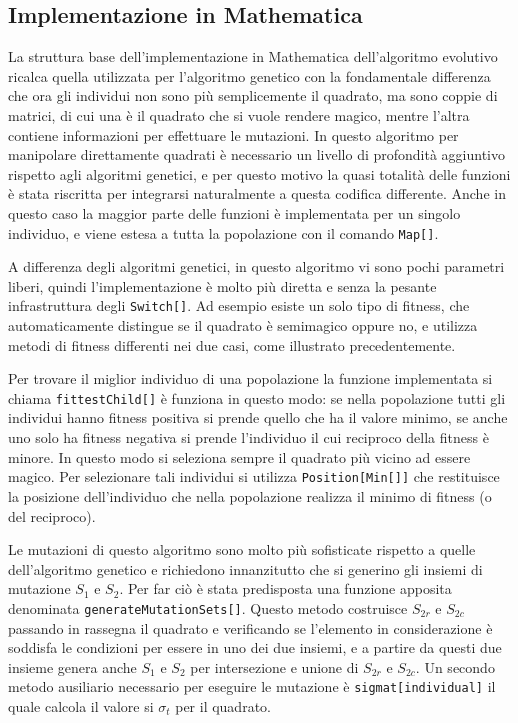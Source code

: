 \documentclass[italian,twoside,twocolumn]{article}
\begin{document}
\subsection{Implementazione in Mathematica}

La struttura base dell'implementazione in Mathematica dell'algoritmo evolutivo ricalca quella utilizzata per l'algoritmo genetico con la fondamentale differenza che ora gli individui non sono più semplicemente il quadrato, ma sono coppie di matrici, di cui una è il quadrato che si vuole rendere magico, mentre l'altra contiene informazioni per effettuare le mutazioni. In questo algoritmo per manipolare direttamente quadrati è necessario un livello di profondità aggiuntivo rispetto agli algoritmi genetici, e per questo motivo la quasi totalità delle funzioni è stata riscritta per integrarsi naturalmente a questa codifica differente. Anche in questo caso la maggior parte delle funzioni è implementata per un singolo individuo, e viene estesa a tutta la popolazione con il comando \texttt{Map[]}.

A differenza degli algoritmi genetici, in questo algoritmo vi sono pochi parametri liberi, quindi l'implementazione è molto più diretta e senza la pesante infrastruttura degli \texttt{Switch[]}. Ad esempio esiste un solo tipo di fitness, che automaticamente distingue se il quadrato è semimagico oppure no, e utilizza metodi di fitness differenti nei due casi, come illustrato precedentemente.

Per trovare il miglior individuo di una popolazione la funzione implementata si chiama \texttt{fittestChild[]} è funziona in questo modo: se nella popolazione tutti gli individui hanno fitness positiva si prende quello che ha il valore minimo, se anche uno solo ha fitness negativa si prende l'individuo il cui reciproco della fitness è minore. In questo modo si seleziona sempre il quadrato più vicino ad essere magico. Per selezionare tali individui si utilizza \texttt{Position[Min[]]} che restituisce la posizione dell'individuo che nella popolazione realizza il minimo di fitness (o del reciproco).

Le mutazioni di questo algoritmo sono molto più sofisticate rispetto a quelle dell'algoritmo genetico e richiedono innanzitutto che si generino gli insiemi di mutazione $ S_1 $ e $ S_2 $. Per far ciò è stata predisposta una funzione apposita denominata \texttt{generateMutationSets[]}. Questo metodo costruisce $ S_{2r} $ e $ S_{2c} $ passando in rassegna il quadrato e verificando se l'elemento in considerazione è soddisfa le condizioni per essere in uno dei due insiemi, e a partire da questi due insieme genera anche $ S_1 $ e $ S_2 $ per intersezione e unione di $ S_{2r} $ e $ S_{2c} $. Un secondo metodo ausiliario necessario per eseguire le mutazione è \texttt{sigmat[individual]} il quale calcola il valore si $ \sigma_t $ per il quadrato. 
\end{document}
